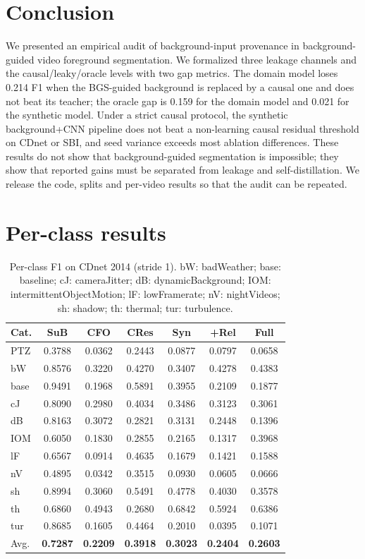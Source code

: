 \documentclass[sn-mathphys-num,iicol]{sn-jnl}
\begin{document}
\section{Conclusion}\label{sec:concl}

We presented an empirical audit of background-input provenance in
background-guided video foreground segmentation. We formalized three leakage
channels and the causal/leaky/oracle levels with two gap metrics. The domain
model loses 0.214 F1 when the BGS-guided background is replaced by a causal one
and does not beat its teacher; the oracle gap is 0.159 for the domain model and
0.021 for the synthetic model. Under a strict causal protocol, the synthetic
background+CNN pipeline does not beat a non-learning causal residual threshold on
CDnet or SBI, and seed variance exceeds most ablation differences. These results
do not show that background-guided segmentation is impossible; they show that
reported gains must be separated from leakage and self-distillation. We release
the code, splits and per-video results so that the audit can be repeated.

\appendix
\section{Per-class results}\label{app:perclass}

\begin{table}[h]
\centering
\scriptsize
\setlength{\tabcolsep}{1pt}
\caption{Per-class F1 on CDnet 2014 (stride 1). bW: badWeather; base: baseline;
cJ: cameraJitter; dB: dynamicBackground; IOM: intermittentObjectMotion;
lF: lowFramerate; nV: nightVideos; sh: shadow; th: thermal; tur: turbulence.}
\label{tab:perclass}
\begin{tabular}{lcccccc}
\toprule
Cat. & SuB & CFO & CRes & Syn & +Rel & Full \\
\midrule
PTZ & 0.3788 & 0.0362 & 0.2443 & 0.0877 & 0.0797 & 0.0658 \\
bW & 0.8576 & 0.3220 & 0.4270 & 0.3407 & 0.4278 & 0.4383 \\
base & 0.9491 & 0.1968 & 0.5891 & 0.3955 & 0.2109 & 0.1877 \\
cJ & 0.8090 & 0.2980 & 0.4034 & 0.3486 & 0.3123 & 0.3061 \\
dB & 0.8163 & 0.3072 & 0.2821 & 0.3131 & 0.2448 & 0.1396 \\
IOM & 0.6050 & 0.1830 & 0.2855 & 0.2165 & 0.1317 & 0.3968 \\
lF & 0.6567 & 0.0914 & 0.4635 & 0.1679 & 0.1421 & 0.1588 \\
nV & 0.4895 & 0.0342 & 0.3515 & 0.0930 & 0.0605 & 0.0666 \\
sh & 0.8994 & 0.3060 & 0.5491 & 0.4778 & 0.4030 & 0.3578 \\
th & 0.6860 & 0.4943 & 0.2680 & 0.6842 & 0.5924 & 0.6386 \\
tur & 0.8685 & 0.1605 & 0.4464 & 0.2010 & 0.0395 & 0.1071 \\
\midrule
Avg. & \textbf{0.7287} & \textbf{0.2209} & \textbf{0.3918} & \textbf{0.3023} & \textbf{0.2404} & \textbf{0.2603} \\
\bottomrule
\end{tabular}
\end{table}
\end{document}
